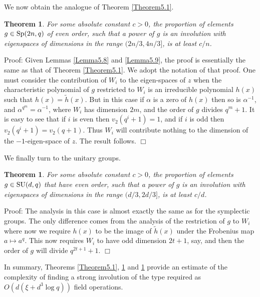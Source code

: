 \documentclass[12pt]{article}
\newtheorem{theorem}[definition]{Theorem}
\newenvironment{proof}{\normalsize {\sc Proof}:}{{\hfill $\Box$ \\}}
\def\Sp{{\rm Sp}}
\def\SU{{\rm SU}}
\begin{document}
\noindent
We now obtain the analogue of Theorem \ref{Theorem5.1}.
\begin{theorem}\label{Theorem5.2}  
For some absolute constant $c>0$, the proportion
of elements $g \in \Sp(2n,q)$ of even order, such that a power of $g$
is an involution with eigenspaces of dimensions in the range
$(2n/3,4n/3]$, is at least $c/n$.
\end{theorem}
\begin{proof} 
Given Lemmas \ref{Lemma5.8} and \ref{Lemma5.9}, the proof is 
essentially the same as that of Theorem \ref{Theorem5.1}.   We
adopt the notation of that proof.
One
must consider the contribution of $W_i$ to the eigen-spaces of $z$
when the characteristic polynomial of $g$ restricted to $W_i$ is
an irreducible polynomial $h(x)$ such that $h(x)=\tilde h(x)$.  But
in this case if $\alpha$ is a zero of $h(x)$ then so is $\alpha^{-1}$,
and $\alpha^{q^m}=\alpha^{-1}$, where $W_i$ has dimension $2m$, and the order of $g$
divides $q^m+1$.  It is easy to see that if $i$ is even then $v_2(q^i+1)=1$,
and if $i$ is odd then $v_2(q^i+1)=v_2(q+1)$.  Thus $W_i$ will
contribute nothing to the dimension of the $-1$-eigen-space of $z$.
The result follows.
\end{proof}

We finally turn to the unitary groups. 
\begin{theorem}\label{Theorem5.3}  For some absolute constant $c>0$, 
the proportion of elements $g\in \SU(d,q)$ that have even order, such that a power of $g$
is an involution with eigenspaces of dimensions in the range
$(d/3,2d/3]$, is at least $c/d $.
\end{theorem}
\begin{proof} 
The analysis in this case is almost
exactly the same as for the symplectic groups.  The only difference
comes from the analysis of the restriction of $g$ to $W_i$ where
now we require $h(x)$ to be the image of $\tilde h(x)$ under the Frobenius
map $a\mapsto a^q$.  This now requires $W_i$ to have odd dimension
$2t+1$, say, and then the order of $g$ will divide $q^{2t+1} +1$.
\end{proof}

In summary, Theorems \ref{Theorem5.1}, \ref{Theorem5.2} and \ref{Theorem5.3} 
provide an estimate of the
complexity of finding a strong involution of the type required 
as $O(d(\xi + d^3 \log q))$ field operations. 
\end{document}
